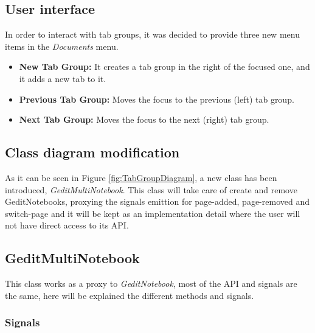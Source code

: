 \subsection{User interface}

In order to interact with tab groups, it was decided to provide three new menu items in the \emph{Documents} menu.
\begin{itemize}
  \item \textbf{New Tab Group:} It creates a tab group in the right of the focused one, and it adds a new tab to it.
  \item \textbf{Previous Tab Group:} Moves the focus to the previous (left) tab group.
  \item \textbf{Next Tab Group:} Moves the focus to the next (right) tab group.
\end{itemize}

\newpage
\subsection{Class diagram modification}


As it can be seen in Figure \ref{fig:TabGroupDiagram}, a new class has been introduced, \emph{GeditMultiNotebook}. This class will take care of create and remove GeditNotebooks, proxying the signals emittion for page-added, page-removed and switch-page and it will be kept as an implementation detail where the user will not have direct access to its API.

\newpage
\subsection{GeditMultiNotebook}

This class works as a proxy to \emph{GeditNotebook}, most of the API and signals are the same, here will be explained the different methods and signals.

\subsubsection{Signals}


